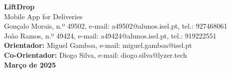 \documentclass[a4paper,twoside,11pt]{article}
\begin{document}
\vspace{-15mm}
\begin{figure}[h]
\begin{center}
\end{center}
\end{figure}
\vspace{-8mm}

\begin{center}
    \LARGE \textbf{LiftDrop} \\ %
    \LARGE Mobile App for Deliveries \\ %
    \vspace{8mm}
    \large Gonçalo Morais, n.º 49502, e-mail: a49502@alunos.isel.pt, tel.: 927468061 \\
    \vspace{1mm}
    \large João Ramos, n.º 49424, e-mail: a49424@alunos.isel.pt, tel.: 919222551 \\
    \vspace{5mm}
    \large \textbf{Orientador:} Miguel Gamboa, e-mail: miguel.gamboa@isel.pt \\
    \vspace{3mm}
    \large \textbf{Co-Orientador:} Diogo Silva, e-mail: diogo.silva@lyzer.tech \\
    \vspace{5mm}
    \textbf{Março de 2025}
\end{center}

\vspace{10mm}
\end{document}
